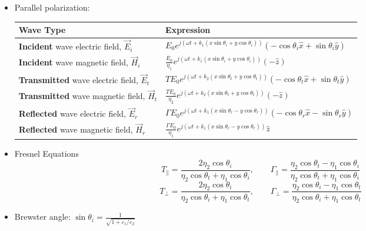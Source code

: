 \documentclass[a4paper, 11pt]{article}
\begin{document}
\begin{itemize}[leftmargin=*]
\item Parallel polarization:
\begin{table}[h!]
\centering
\begin{tabular}{@{}l l@{}}
\toprule
\textbf{Wave Type} & \textbf{Expression} \\ \midrule
\textbf{Incident} wave electric field, $\vec{E}_i$ & $\displaystyle E_0 e^{j(\omega t + k_1 (x \sin \theta_i + y \cos \theta_i))} (-\cos \theta_i \hat{x} + \sin \theta_i \hat{y})$ \\[.7em]
\textbf{Incident} wave magnetic field, $\vec{H}_i$ & $\displaystyle \frac{E_0}{\eta_1} e^{j(\omega t + k_1 (x \sin \theta_i + y \cos \theta_i))} (-\hat{z})$ \\[.7em]
\textbf{Transmitted} wave electric field, $\vec{E}_t$ & $\displaystyle T E_0 e^{j(\omega t + k_2 (x \sin \theta_t + y \cos \theta_t))} (-\cos \theta_t \hat{x} + \sin \theta_t \hat{y})$ \\[.7em]
\textbf{Transmitted} wave magnetic field, $\vec{H}_t$ & $\displaystyle \frac{T E_0}{\eta_2} e^{j(\omega t + k_2 (x \sin \theta_t + y \cos \theta_t))} (-\hat{z})$ \\[.7em]
\textbf{Reflected} wave electric field, $\vec{E}_r$ & $\displaystyle \Gamma E_0 e^{j(\omega t + k_1 (x \sin \theta_r - y \cos \theta_r))} (-\cos \theta_r \hat{x} - \sin \theta_r \hat{y})$ \\[.7em]
\textbf{Reflected} wave magnetic field, $\vec{H}_r$ & $\displaystyle \frac{\Gamma E_0}{\eta_1} e^{j(\omega t + k_1 (x \sin \theta_r - y \cos \theta_r))} \hat{z}$ \\ \bottomrule
\end{tabular}
\end{table}

\item Fresnel Equations 
    \[
        T_{\parallel}= \frac{2\eta_{2}\cos\theta_{i}}{\eta_{2}\cos\theta_{t}+\eta_{1}\cos\theta_{i}},
        \quad \quad
        \Gamma_{\parallel} = \frac{\eta_{2}\cos\theta_{t}-\eta_{1}\cos\theta_{i}}{\eta_{2}\cos\theta_{t}+\eta_{1}\cos\theta_{i}}
    \]
    \[
        T_{\perp}= \frac{2\eta_{2}\cos\theta_{i}}{\eta_{2}\cos\theta_{i}+\eta_{1}\cos\theta_{t}},
        \quad \quad
        \Gamma_{\perp} = \frac{\eta_{2}\cos\theta_{i}-\eta_{1}\cos\theta_{t}}{\eta_{2}\cos\theta_{i}+\eta_{1}\cos\theta_{t}}
    \]
    
\item Brewster angle: $\displaystyle \sin\theta_{i}=\frac{1}{\sqrt{1+\varepsilon_{1}/\varepsilon_{2}}}$
\end{itemize}
\end{document}
